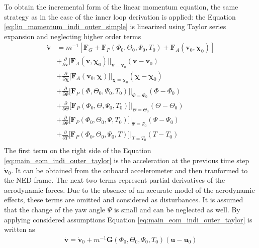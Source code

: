 \documentclass[11pt, a4paper, twoside]{report}
\begin{document}
To obtain the incremental form of the linear momentum equation, the same strategy as in the case of the inner loop derivation is applied: the Equation \ref{eq:lin_momentum_indi_outer_simple} is linearized using Taylor series expansion and neglecting higher order terms
\begin{equation}
	\begin{split}
		\bm{\dot{v}} &= m^{-1} [\bm{F}_G + \bm{F}_P(\Phi_0, \Theta_0, \Psi_0, T_0)+ \bm{F}_A(\bm{v}_0, \bm{\chi}_0)]  \\		
		&+ \frac{\partial}{\partial \bm{v}} \big[ \bm{F}_A(\bm{v}, \bm{\chi}_0) \big] \bigg| _{\bm{v}=\bm{v}_0} (\bm{v}-\bm{v}_0) \\
		&+ \frac{\partial}{\partial \bm{\chi}} \big[ \bm{F}_A(\bm{v}_0, \bm{\chi}) \big] \bigg| _{\bm{\chi}=\bm{\chi}_0} (\bm{\chi}-\bm{\chi}_0) \\
		&+ \frac{\partial}{\partial \Phi} \big[ \bm{F}_P(\Phi, \Theta_0, \Psi_0, T_0) \big] \bigg| _{\Phi=\Phi_0} (\Phi-\Phi_0) \\
		&+ \frac{\partial}{\partial \Theta} \big[ \bm{F}_P(\Phi_0, \Theta, \Psi_0, T_0) \big] \bigg| _{\Theta=\Theta_0} (\Theta-\Theta_0) \\
		&+ \frac{\partial}{\partial \Psi} \big[ \bm{F}_P(\Phi_0, \Theta_0, \Psi, T_0) \big] \bigg| _{\Psi=\Psi_0} (\Psi-\Psi_0) \\
		&+ \frac{\partial}{\partial T} \big[ \bm{F}_P(\Phi_0, \Theta_0, \Psi_0, T) \big] \bigg| _{T=T_0} (T-T_0) \\
		\label{eq:main_eom_indi_outer_taylor}
	\end{split}
\end{equation}
The first term on the right side of the Equation \ref{eq:main_eom_indi_outer_taylor} is the acceleration at the previous time step $\bm{\dot{v}}_0$. It can be obtained from the onboard accelerometer and then tranformed to the \acrshort{NED} frame. The next two terms represent partial derivatives of the aerodynamic forces. Due to the absence of an accurate model of the aerodynamic effects, these terms are omitted and considered as disturbances. It is assumed that the change of the yaw angle $\Psi$ is small and can be neglected as well. By applying considered assumptions Equation \ref{eq:main_eom_indi_outer_taylor} is written as 
\begin{equation}
	\begin{split}
		\bm{\dot{v}} = \bm{\dot{v}}_0 +  m^{-1} \bm{G}(\Phi_0, \Theta_0, \Psi_0, T_0) (\bm{u} - \bm{u}_0)
		\label{eq:lin_momentum_indi_outer_lin}
	\end{split}
\end{equation}
\end{document}
